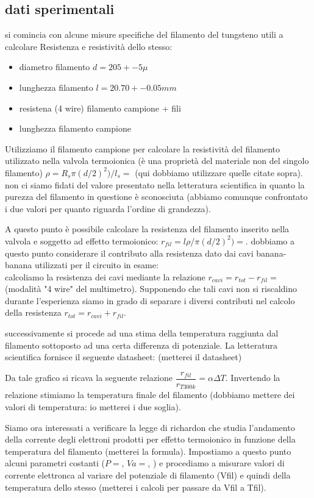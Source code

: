 \documentclass[11pt,a4paper]{article}
\begin{document}
\subsection{dati sperimentali}

si comincia con alcune misure specifiche del filamento del tungsteno utili a calcolare Resistenza e resistività dello stesso:
\begin{itemize}
\item diametro filamento ${d=205+-5\mu}$ 
\item lunghezza filamento ${l=20.70+-0.05mm}$
\item resistena (4 wire) filamento campione + fili ${}$
\item lunghezza filamento campione ${}$
\end{itemize}


Utilizziamo il filamento campione per calcolare la resistività del filamento utilizzato nella valvola termoionica (è una proprietà del materiale non del singolo filamento) $\rho=R_{s}\pi (d/2)^{2})/l_{s}=$ (qui dobbiamo utilizzare quelle citate sopra).  non ci siamo fidati del valore presentato nella letteratura scientifica in quanto la purezza del filamento in questione è sconosciuta (abbiamo comunque confrontato i due valori per quanto riguarda l'ordine di grandezza).

A questo punto è possibile calcolare la resistenza del filamento inserito nella valvola e soggetto ad effetto termoionico:
$ r_{fil}=l\rho/\pi (d/2)^{2})=$. 
dobbiamo a questo punto considerare il contributo alla resistenza dato dai cavi banana-banana utilizzati per il circuito in esame:\\
calcoliamo la resistenza dei cavi mediante la relazione $r_{cavi}=r_{tot}-r_{fil}=$(modalità "4 wire" del multimetro). Supponendo che tali cavi non si riscaldino durante l'esperienza siamo in grado di separare i diversi contributi nel calcolo della resistenza $r_{tot}=r_{cavi}+r_{fil}$.

successivamente si procede ad una stima della temperatura raggiunta dal filamento sottoposto ad una certa differenza di potenziale.
La letteratura scientifica fornisce il seguente datasheet: (metterei il datasheet)

Da tale grafico si ricava la seguente relazione $\dfrac{r_{fil}}{r_{T300k}}=\alpha \Delta T $. Invertendo la relazione stimiamo la temperatura finale del filamento (dobbiamo mettere dei valori di temperatura: io metterei i due soglia).

Siamo ora interessati a verificare la legge di richardon che studia l'andamento della corrente degli elettroni prodotti per effetto termoionico in funzione della temperatura del filamento (metterei la formula).
Impostiamo a questo punto alcuni parametri costanti (${P=}$, ${Va=}$, ) e procediamo a misurare valori di corrente elettronca al variare del potenziale di filamento (Vfil) e quindi della temperatura dello stesso (metterei i calcoli per passare da Vfil a Tfil).
\end{document}
